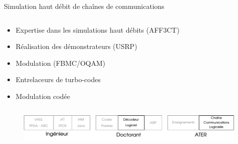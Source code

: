 \documentclass[t,compress,mathserif,12pt,xcolor=dvipsnames]{beamer}
\begin{document}
\begin{frame}[t]{Simulation haut débit de chaînes de communications}
  \begin{minipage}[t][5.0cm][t]{\textwidth}
    \begin{columns}[T]
      \begin{column}{0.63\textwidth}
        \begin{itemize}
          \item<+-> Expertise dans les simulations haut débits (AFF3CT)
          \item<+-> Réalisation des démonstrateurs (USRP)
          \vspace{0.8cm}
          \item<+-> Modulation (FBMC/OQAM)
          \item<3-> Entrelaceurs de turbo-codes
          \item<3-> Modulation codée
        \end{itemize}
      \end{column}
      \begin{column}{0.04\textwidth}
      \end{column}
      \begin{column}{0.33\textwidth}
        \centering
      \end{column}
    \end{columns}
  \end{minipage}
  \begin{figure}[htp]
    \centering
    \includegraphics[width=\textwidth]{fig/frise21}
  \end{figure}
\end{frame}
\end{document}
